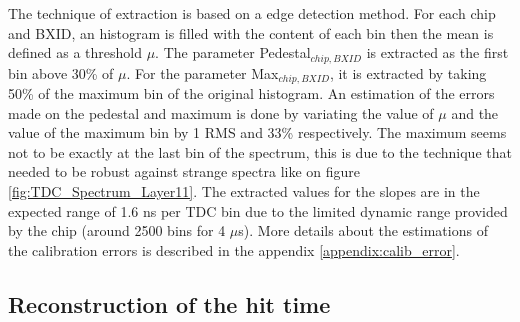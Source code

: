\documentclass[twoside,a4paper,11pt]{article}
\begin{document}
The technique of extraction is based on a edge detection method. For each chip and BXID, an histogram is filled with the content of each bin then the mean is defined as a threshold $\mu$. The parameter Pedestal$_{chip, BXID}$ is extracted as the first bin above 30\% of $\mu$. For the parameter Max$_{chip, BXID}$, it is extracted by taking 50\% of the maximum bin of the original histogram. An estimation of the errors made on the pedestal and maximum is done by variating the value of $\mu$ and the value of the maximum bin by 1 RMS and 33\% respectively. The maximum seems not to be exactly at the last bin of the spectrum, this is due to the technique that needed to be robust against strange spectra like on figure \ref{fig:TDC_Spectrum_Layer11}.
The extracted values for the slopes are in the expected range of 1.6 ns per TDC bin due to the limited dynamic range provided by the chip (around 2500 bins for 4 $\mu$s). More details about the estimations of the calibration errors is described in the appendix \ref{appendix:calib_error}.

\subsection{Reconstruction of the hit time}
\end{document}
